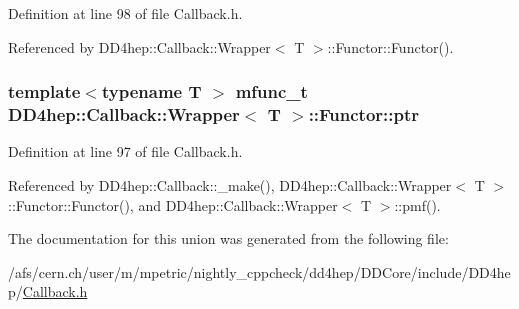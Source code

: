Definition at line 98 of file Callback.h.

Referenced by DD4hep::Callback::Wrapper$<$ T $>$::Functor::Functor().\hypertarget{union_d_d4hep_1_1_callback_1_1_wrapper_1_1_functor_aa729847f113eb9d2b69d7fd602c50f77}{
\subsubsection[{ptr}]{\setlength{\rightskip}{0pt plus 5cm}template$<$typename T $>$ {\bf mfunc\_\-t} {\bf DD4hep::Callback::Wrapper}$<$ {\bf T} $>$::{\bf Functor::ptr}}}
\label{union_d_d4hep_1_1_callback_1_1_wrapper_1_1_functor_aa729847f113eb9d2b69d7fd602c50f77}


Definition at line 97 of file Callback.h.

Referenced by DD4hep::Callback::\_\-make(), DD4hep::Callback::Wrapper$<$ T $>$::Functor::Functor(), and DD4hep::Callback::Wrapper$<$ T $>$::pmf().

The documentation for this union was generated from the following file:\begin{DoxyCompactItemize}
\item 
/afs/cern.ch/user/m/mpetric/nightly\_\-cppcheck/dd4hep/DDCore/include/DD4hep/\hyperlink{_callback_8h}{Callback.h}\end{DoxyCompactItemize}
